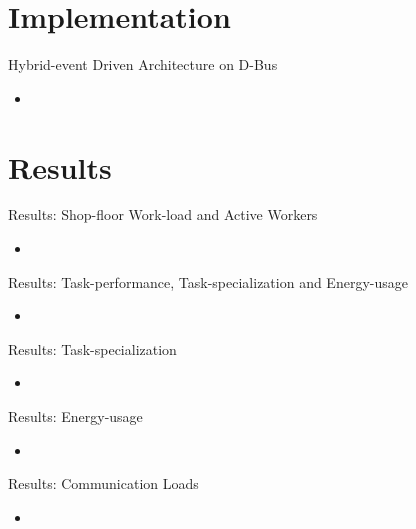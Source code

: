 \documentclass{beamer}
\begin{document}
\section{Implementation}
\begin{frame}[t]{Hybrid-event Driven Architecture on D-Bus}
  \begin{itemize}
    \item \alert{}
    \end{itemize}
\end{frame}
\section{Results}
\begin{frame}[t]{Results: Shop-floor Work-load and Active Workers}
  \begin{itemize}
    \item \alert{}
    \end{itemize}
\end{frame}
\begin{frame}[t]{Results: Task-performance, Task-specialization and Energy-usage}
  \begin{itemize}
    \item \alert{}
    \end{itemize}
\end{frame}
\begin{frame}[t]{Results: Task-specialization}
  \begin{itemize}
    \item \alert{}
    \end{itemize}
\end{frame}
\begin{frame}[t]{Results: Energy-usage}
  \begin{itemize}
    \item \alert{}
    \end{itemize}
\end{frame}
\begin{frame}[t]{Results: Communication Loads}
  \begin{itemize}
    \item \alert{}
    \end{itemize}
\end{frame}
\end{document}
